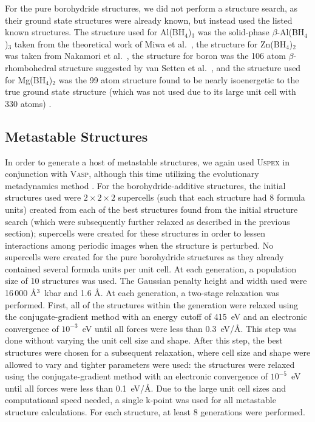 \documentclass[twocolumn, prb, showpacs]{revtex4-1}
\begin{document}
For the pure borohydride structures, we did not perform a structure search,
as their ground state structures were already known, but instead used
the listed known structures.
The structure used for Al(BH$_4$)$_3$ was the
solid-phase $\beta$-Al(BH$_4$)$_3$ taken from the theoretical work of Miwa et
al.\
\cite{Miwa_2007:first-principles_study,Aldridge_1997:some_tetrahydroborate},
the structure for Zn(BH$_4$)$_2$ was taken from Nakamori et al.\
\cite{Nakamori_2006:correlation_between}, the structure for boron was the 106
atom $\beta$-rhombohedral structure suggested by van Setten et
al.~\cite{Setten_2007:thermodynamic_stability}, and the structure used for
Mg(BH$_4$)$_2$ was the 99 atom structure found to be nearly isoenergetic
to the true ground state structure (which was not used due to its large unit
cell with 330 atoms) \cite{Bil_2011:van_waals}. 




\subsection{Metastable Structures}

In order to generate a host of metastable structures, we again used
\textsc{Uspex} in conjunction with \textsc{Vasp}, although this time utilizing
the evolutionary metadynamics method \cite{Zhu_2012:evolutionary_metadynamics, Zhu_2015:generalized_evolutionary}. 
For the borohydride-additive structures, the initial structures used were $2\times2\times2$ supercells
(such that each structure had 8 formula units)
created from each of the best structures found from the initial structure search
(which were subsequently further relaxed as described in the previous section); supercells
were created for these structures in order to lessen interactions among periodic images when
the structure is perturbed. No supercells were created for the pure borohydride structures
as they already contained several formula units per unit cell. At each
generation, a population size of 10 structures was used. The Gaussian penalty height
and width used were 16\,000 \AA$^{3}$~kbar and 1.6 \AA. At each generation, a two-stage relaxation was performed.
First, all of the structures within the generation were relaxed using the
conjugate-gradient method with an energy cutoff of 415~eV and an electronic
convergence of $10^{-3}$~eV until all forces were less than 0.3~eV/\AA. This
step was done without varying the unit cell size and shape. After this step,
the best structures were chosen for a subsequent relaxation, where cell size
and shape were allowed to vary and tighter parameters were used: the structures
were relaxed using the conjugate-gradient method with an electronic convergence
of $10^{-5}$~eV until all forces were less
than 0.1~eV/\AA. Due to the large unit cell sizes and computational speed needed, 
a single k-point was used for all metastable structure calculations. For each structure, at least 8 generations were performed.
 
\end{document}
